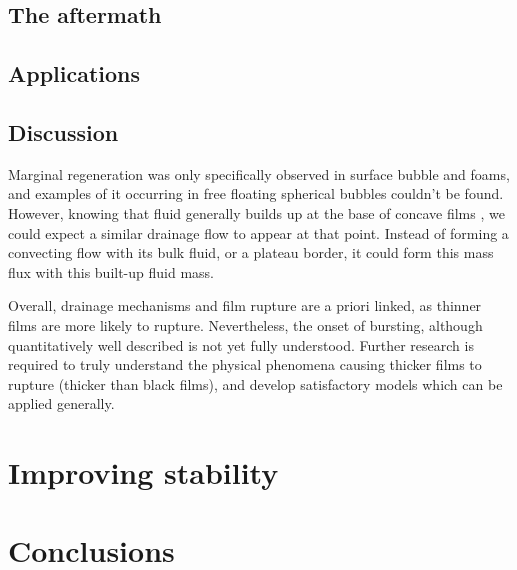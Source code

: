 \documentclass[a4paper,12pt]{article}
\numberwithin{equation}{section}
\numberwithin{figure}{section}
\numberwithin{table}{section}
\begin{document}
\subsection{The aftermath}

\subsection{Applications}

\subsection{Discussion}

Marginal regeneration was only specifically observed in surface bubble and foams, and examples of it occurring in free floating spherical bubbles couldn't be found. However, knowing that fluid generally builds up at the base of concave films \cite{Shen2020}, we could expect a similar drainage flow to appear at that point. Instead of forming a convecting flow with its bulk fluid, or a plateau border, it could form this mass flux with this built-up fluid mass.

Overall, drainage mechanisms and film rupture are a priori linked, as thinner films are more likely to rupture. Nevertheless, the onset of bursting, although quantitatively well described is not yet fully understood. Further research is required to truly understand the physical phenomena causing thicker films to rupture (thicker than black films), and develop satisfactory models which can be applied generally.


\section{Improving stability}

\section{Conclusions}


\newpage
\singlespacing





\end{document}
